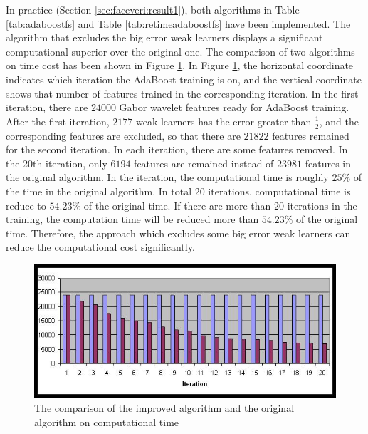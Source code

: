 In practice (\mbox{Section} \ref{sec:faceveri:result1}), both algorithms in \mbox{Table} \ref{tab:adaboostfs} and \mbox{Table} \ref{tab:retimeadaboostfs} have been implemented. The algorithm that excludes the big error weak learners displays a significant computational superior over the original one. The comparison of two algorithms on time cost has been shown in \mbox{Figure} \ref{fig:comparison}. In \mbox{Figure} \ref{fig:comparison}, the horizontal coordinate indicates which iteration the AdaBoost training is on, and the vertical coordinate shows that number of features trained in the corresponding iteration. In the first iteration, there are $24000$ Gabor wavelet features ready for AdaBoost training. After the first iteration, $2177$ weak learners has the error greater than $\frac{1}{2}$, and the corresponding features are excluded, so that there are $21822$ features remained for the second iteration. In each iteration, there are some features removed. In the 20th iteration, only $6194$ features are remained instead of $23981$ features in the original algorithm. In the iteration, the computational time is roughly $25\%$ of the time in the original algorithm. In total 20 iterations, computational time is reduce to $54.23\%$ of the original time. If there are more than $20$ iterations in the training, the computation time will be reduced more than $54.23\%$ of the original time. Therefore, the approach which excludes some big error weak learners can reduce the computational cost significantly.

\begin{figure}
\begin{center}
  \includegraphics[width=\textwidth]{ch4/figures/comparison.jpg}
\caption{The comparison of the improved algorithm and the original algorithm on computational time}
\label{fig:comparison}
\end{center}
\end{figure} 


